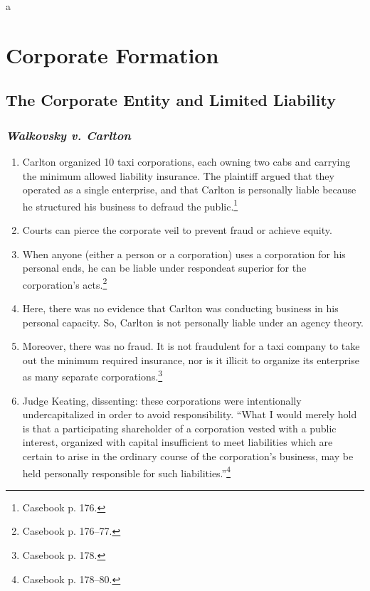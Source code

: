 a\section{Corporate Formation}

\subsection{The Corporate Entity and Limited Liability}

\subsubsection{\emph{Walkovsky v. Carlton}}

\begin{enumerate}
    \item Carlton organized 10 taxi corporations, each owning two cabs and 
    carrying the minimum allowed liability insurance. The plaintiff argued 
    that they operated as a single enterprise, and that Carlton is personally 
    liable because he structured his business to defraud the 
    public.\footnote{Casebook p. 176.}
    \item Courts can pierce the corporate veil to prevent fraud or achieve 
    equity.
    \item When anyone (either a person or a corporation) uses a corporation 
    for his personal ends, he can be liable under respondeat superior for the 
    corporation's acts.\footnote{Casebook p. 176--77.}
    \item Here, there was no evidence that Carlton was conducting business in 
    his personal capacity. So, Carlton is not personally liable under an 
    agency theory.
    \item Moreover, there was no fraud. It is not fraudulent for a taxi 
    company to take out the minimum required insurance, nor is it illicit to 
    organize its enterprise as many separate corporations.\footnote{Casebook 
    p. 178.}
    \item Judge Keating, dissenting: these corporations were intentionally 
    undercapitalized in order to avoid responsibility. ``What I would merely 
    hold is that a participating shareholder of a corporation vested with a 
    public interest, organized with capital insufficient to meet liabilities 
    which are certain to arise in the ordinary course of the corporation's 
    business, may be held personally responsible for such 
    liabilities.''\footnote{Casebook p. 178--80.}
\end{enumerate}

